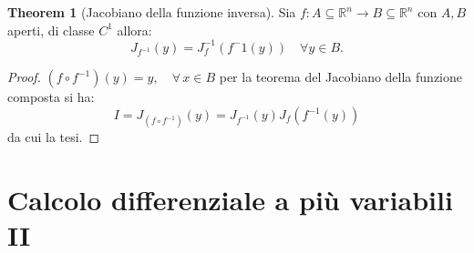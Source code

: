 \documentclass[leqno]{article}
\theoremstyle{definition}
\numberwithin{equation}{section}
\newtheorem{theorem}{Theorem}[section]
\theoremstyle{remark}
\begin{document}
	\begin{theorem}[Jacobiano della funzione inversa]
		Sia $f:A\subseteq \mathbb{R}^n \rightarrow B \subseteq \mathbb{R}^n$ con $A,B$ aperti, di classe $C^1$ allora:
		\begin{equation}
			J_{f^{-1}}(y) = J_f^{-1}(f^-1(y)) \quad \forall y \in B.
		\end{equation}
		\begin{proof}
			$(f\circ f^{-1})(y)=y, \quad \forall \, x \in B$ per la teorema del Jacobiano della funzione composta si ha: 
			\begin{equation}
				I=J_{(f \circ f^{-1})}(y)=J_{f^{-1}}(y)J_f(f^{-1}(y))
			\end{equation}
			da cui la tesi. 
		\end{proof}
	\end{theorem}
	
	
	\section{Calcolo differenziale a più variabili II}
	
\end{document}
